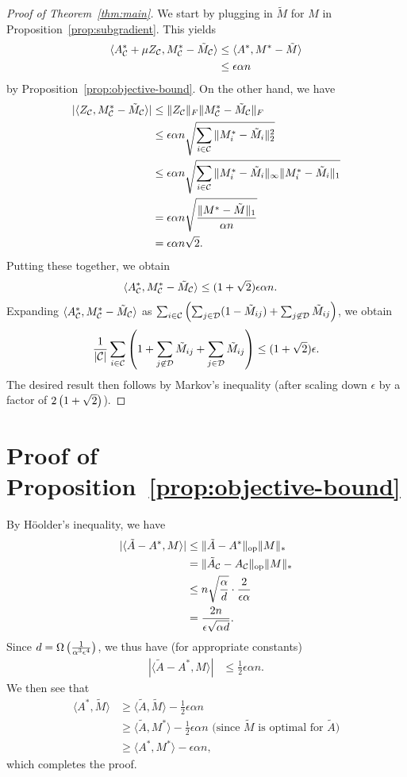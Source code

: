 \documentclass[11pt]{article}
\newcommand{\M}{\tilde{M}}
\newcommand{\Mm}{M^*}
\newcommand{\A}{\tilde{A}}
\newcommand{\Aa}{A^*}
\newcommand{\sD}{\mathcal{D}}
\begin{document}
\begin{proof}[Proof of Theorem~\ref{thm:main}]
We start by plugging in $\M$ for $M$ in Proposition~\ref{prop:subgradient}. This yields
\begin{align}
\langle \Aa_{\sC} + \mu Z_{\sC}, \Mm_{\sC} - \M_{\sC} \rangle &\leq \langle \Aa, \Mm - \M \rangle \\
 &\leq \epsilon \alpha n
\end{align}
by Proposition~\ref{prop:objective-bound}.
On the other hand, we have 
\begin{align}
|\langle Z_{\sC}, \Mm_{\sC} - \M_{\sC} \rangle| &\leq \|Z_{\sC}\|_F\|\Mm_{\sC} - \M_{\sC}\|_F \\
 &\leq \epsilon\alpha n \sqrt{\sum_{i \in \sC} \|\Mm_i - \M_i\|_2^2} \\
 &\leq \epsilon\alpha n \sqrt{\sum_{i \in \sC} \|\Mm_i - \M_i\|_{\infty}\|\Mm_i - \M_i\|_1} \\
 &= \epsilon\alpha n \sqrt{\frac{\|\Mm-\M\|_1}{\alpha n}} \\
 &= \epsilon\alpha n \sqrt{2}.
\end{align}
Putting these together, we obtain
\begin{align}
\langle \Aa_{\sC}, \Mm_{\sC} - \M_{\sC} \rangle &\leq (1+\sqrt{2})\epsilon \alpha n.
\end{align}
Expanding $\langle \Aa_{\sC}, \Mm_{\sC} - \M_{\sC} \rangle$ as 
$\sum_{i \in \sC}\p{\sum_{j \in \sD} (1 - \M_{ij}) + \sum_{j \not\in \sD} \M_{ij}}$, 
we obtain 
\[ \frac{1}{|\sC|}\sum_{i \in \sC}\p{1 + \sum_{j\not\in \sD} \M_{ij} + \sum_{j \in \sD} \M_{ij}} \leq (1+\sqrt{2})\epsilon. \]
The desired result then follows by Markov's inequality (after scaling down $\epsilon$ by a factor of $2\left(1+\sqrt{2}\right)$).
\end{proof}

\section{Proof of Proposition~\ref{prop:objective-bound}}
By H\"{o}older's inequality, we have 
\begin{align}
|\langle \A-\Aa, M \rangle| &\leq \|\A-\Aa\|_{\op}\|M\|_* \\
 &= \|\A_{\sC}-A_{\sC}\|_{\op}\|M\|_* \\
 &\leq n\sqrt{\frac{\alpha}{d}} \cdot \frac{2}{\epsilon\alpha} \\
 &= \frac{2n}{\epsilon\sqrt{\alpha d}}.
\end{align}
Since $d = \Omega\left(\frac{1}{\alpha^3\epsilon^4}\right)$, we thus have (for appropriate constants)
\begin{align}
|\langle \A-\Aa, M \rangle| &\leq \frac{1}{2}\epsilon \alpha n.
\end{align}
We then see that
\begin{align}
\langle \Aa, \M \rangle  &\geq \langle \A, \M \rangle - \frac{1}{2}\epsilon \alpha n \\
 &\geq \langle \A, \Mm \rangle - \frac{1}{2} \epsilon \alpha n \text{ (since $\M$ is optimal for $\A$)} \\
 &\geq \langle \Aa, \Mm \rangle - \epsilon \alpha n,
\end{align}
which completes the proof.
\end{document}
